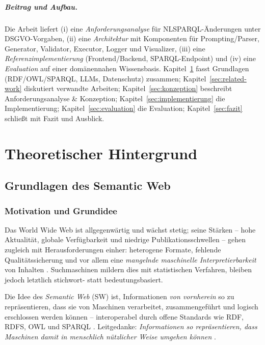 \paragraph{Beitrag und Aufbau.}
Die Arbeit liefert (i) eine \emph{Anforderungsanalyse} für NL{\textrightarrow}SPARQL-Änderungen unter DSGVO-Vorgaben, (ii) eine \emph{Architektur} mit Komponenten für Prompting/Parser, Generator, Validator, Executor, Logger und Visualizer, (iii) eine \emph{Referenzimplementierung} (Frontend/Backend, SPARQL-Endpoint) und (iv) eine \emph{Evaluation} auf einer domänennahen Wissensbasis. Kapitel~\ref{sec:theorie} fasst Grundlagen (RDF/OWL/SPARQL, LLMs, Datenschutz) zusammen; Kapitel~\ref{sec:related-work} diskutiert verwandte Arbeiten; Kapitel~\ref{sec:konzeption} beschreibt Anforderungsanalyse \& Konzeption; Kapitel~\ref{sec:implementierung} die Implementierung; Kapitel~\ref{sec:evaluation} die Evaluation; Kapitel~\ref{sec:fazit} schließt mit Fazit und Ausblick.






\chapter{Theoretischer Hintergrund}
\label{sec:theorie}

\section{Grundlagen des Semantic Web}
\label{sec:grundlagen-semantic-web}

\subsection{Motivation und Grundidee}

Das World Wide Web ist allgegenwärtig und wächst stetig; seine Stärken -- hohe Aktualität, globale Verfügbarkeit und niedrige Publikationsschwellen -- gehen zugleich mit Herausforderungen einher: heterogene Formate, fehlende Qualitätssicherung und vor allem eine \emph{mangelnde maschinelle Interpretierbarkeit} von Inhalten \cite{Hitzler}. Suchmaschinen mildern dies mit statistischen Verfahren, bleiben jedoch letztlich stichwort- statt bedeutungsbasiert. 

Die Idee des \emph{Semantic Web} (SW) ist, Informationen \emph{von vornherein} so zu repräsentieren, dass sie von Maschinen verarbeitet, zusammengeführt und logisch erschlossen werden können -- interoperabel durch offene Standards wie RDF, RDFS, OWL und SPARQL \cite{Hitzler,AntoniouVanHarmelen}. Leitgedanke: \emph{Informationen so repräsentieren, dass Maschinen damit in menschlich nützlicher Weise umgehen können} \cite{Hitzler}.


